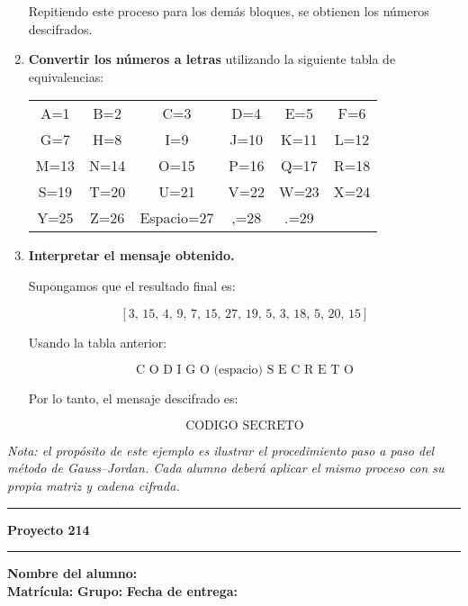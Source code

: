 \documentclass{article}%
\begin{document}
\begin{enumerate}
    Repitiendo este proceso para los demás bloques, se obtienen los números descifrados.

    \item \textbf{Convertir los números a letras} utilizando la siguiente tabla de equivalencias:

    \begin{center}
    \renewcommand{\arraystretch}{1.2}
    \small
    \begin{tabular}{cccccc}
    A=1 & B=2 & C=3 & D=4 & E=5 & F=6 \\
    G=7 & H=8 & I=9 & J=10 & K=11 & L=12 \\
    M=13 & N=14 & O=15 & P=16 & Q=17 & R=18 \\
    S=19 & T=20 & U=21 & V=22 & W=23 & X=24 \\
    Y=25 & Z=26 & Espacio=27 & ,=28 & .=29 &
    \end{tabular}
    \end{center}

    \item \textbf{Interpretar el mensaje obtenido.}

    Supongamos que el resultado final es:

    \[
    [3,\, 15,\, 4,\, 9,\, 7,\, 15,\, 27,\, 19,\, 5,\, 3,\, 18,\, 5,\, 20,\, 15]
    \]

    Usando la tabla anterior:

    \[
    \text{C O D I G O (espacio) S E C R E T O}
    \]

    Por lo tanto, el mensaje descifrado es:

    \[
    \boxed{\text{CODIGO SECRETO}}
    \]
\end{enumerate}

\bigskip
\textit{Nota: el propósito de este ejemplo es ilustrar el procedimiento paso a paso del método de Gauss–Jordan.
Cada alumno deberá aplicar el mismo proceso con su propia matriz y cadena cifrada.}

\bigskip
\hrule
\bigskip%

\newpage
\vspace{0.5em}
\noindent\textbf{Proyecto 214}\\%
\noindent\hrule
\vspace{1em}

\noindent\textbf{Nombre del alumno:} \underline{\hspace{11.8cm}}\\[8pt]
\noindent\textbf{Matrícula:} \underline{\hspace{4cm}} 
\textbf{Grupo:} \underline{\hspace{1.9cm}}
\textbf{Fecha de entrega:} \underline{\hspace{2.5cm}}\\[12pt]
\end{document}
